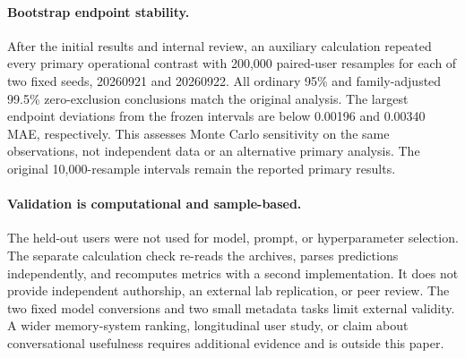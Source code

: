 \paragraph{Bootstrap endpoint stability.} After the initial results and internal review, an auxiliary calculation repeated every primary operational contrast with 200,000 paired-user resamples for each of two fixed seeds, 20260921 and 20260922. All ordinary 95\% and family-adjusted 99.5\% zero-exclusion conclusions match the original analysis. The largest endpoint deviations from the frozen intervals are below 0.00196 and 0.00340 MAE, respectively. This assesses Monte Carlo sensitivity on the same observations, not independent data or an alternative primary analysis. The original 10,000-resample intervals remain the reported primary results.

\paragraph{Validation is computational and sample-based.} The held-out users were not used for model, prompt, or hyperparameter selection. The separate calculation check re-reads the archives, parses predictions independently, and recomputes metrics with a second implementation. It does not provide independent authorship, an external lab replication, or peer review. The two fixed model conversions and two small metadata tasks limit external validity. A wider memory-system ranking, longitudinal user study, or claim about conversational usefulness requires additional evidence and is outside this paper.
